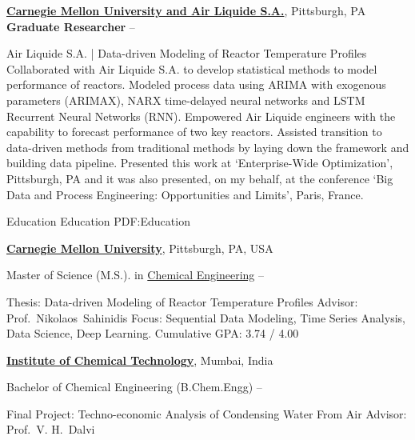 \documentclass[letterpaper,MMMyyyy,nonstopmode]{simpleresumecv}
\begin{document}
\begin{Body}
\BigGap

\Entry
\href{http://cmu.edu/cheme}
{\textbf{Carnegie Mellon University and Air Liquide S.A.}},
Pittsburgh, PA
\Entry
\textbf{Graduate Researcher}
\hfill
{} --

\Gap
\BulletItem
Air Liquide S.A. | Data-driven Modeling of Reactor Temperature Profiles
\SubBulletItem
Collaborated with Air Liquide S.A. to develop statistical methods to model performance of reactors.
\SubBulletItem
Modeled process data using ARIMA with exogenous parameters (ARIMAX), NARX time-delayed neural networks and LSTM Recurrent Neural Networks (RNN).
\SubBulletItem
Empowered Air Liquide engineers with the capability to forecast performance of two key reactors.
\SubBulletItem
Assisted transition to data-driven methods from traditional methods by laying down the framework and building data pipeline.
\SubBulletItem
Presented this work at ‘Enterprise-Wide Optimization’, Pittsburgh, PA and it was also presented, on my behalf, at the conference ‘Big Data and Process Engineering: Opportunities and Limits’, Paris, France.


\Section
{Education}
{Education}
{PDF:Education}

\Entry
\href{http://www.cmu.edu/}
{\textbf{Carnegie Mellon University}},
Pittsburgh, PA, USA

\Gap
\BulletItem
Master of Science (M.S.). in
\href{http://www.cmu.edu/cheme}
{Chemical Engineering}
\hfill
{} --
\begin{Detail}
\SubBulletItem
Thesis:
{Data-driven Modeling of Reactor Temperature Profiles}
\SubBulletItem
Advisor:
Prof.~Nikolaos~Sahinidis
\SubBulletItem
Focus:
Sequential Data Modeling, Time Series Analysis, Data Science, Deep Learning.
\SubBulletItem
Cumulative GPA: 3.74 / 4.00
\end{Detail}

\BigGap
\Entry
\href{http://www.ictmumbai.edu.in/}
{\textbf{Institute of Chemical Technology}},
Mumbai, India

\Gap
\BulletItem
Bachelor of Chemical Engineering (B.Chem.Engg)
\hfill
{} --
\begin{Detail}
\SubBulletItem
Final Project:
{Techno-economic Analysis of Condensing Water From Air}
\SubBulletItem
Advisor:
Prof.~V. H.~Dalvi
\end{Detail}


\end{Body}
\end{document}
